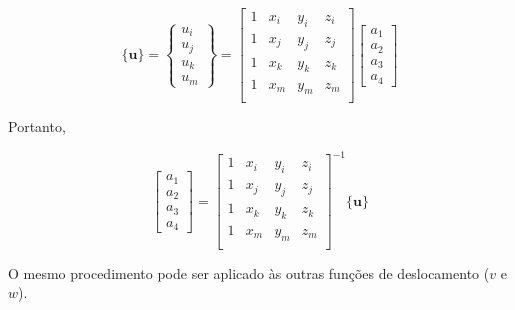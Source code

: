 \begin{equation}
    \{\mathbf{u}\} = \begin{Bmatrix}
        u_i \\
        u_j \\
        u_k \\
        u_m
    \end{Bmatrix} = 
    \begin{bmatrix}
        1 & x_i & y_i & z_i \\
        1 & x_j & y_j & z_j \\
        1 & x_k & y_k & z_k \\
        1 & x_m & y_m & z_m \\
    \end{bmatrix}
    \begin{bmatrix}
        a_1 \\ a_2 \\ a_3 \\ a_4
    \end{bmatrix} 
\end{equation}

Portanto,

\begin{equation}
    \begin{bmatrix}
        a_1 \\ a_2 \\ a_3 \\ a_4
    \end{bmatrix}
    = \begin{bmatrix}
        1 & x_i & y_i & z_i \\
        1 & x_j & y_j & z_j \\
        1 & x_k & y_k & z_k \\
        1 & x_m & y_m & z_m \\
    \end{bmatrix}^{-1} \{\mathbf{u}\}
\end{equation}

O mesmo procedimento pode ser aplicado às outras funções de deslocamento ($v$ e $w$).




